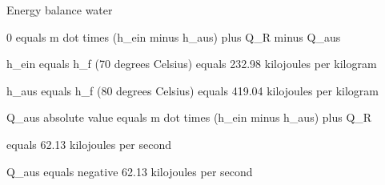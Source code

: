Energy balance water

0 equals m dot times (h_ein minus h_aus) plus Q_R minus Q_aus

h_ein equals h_f (70 degrees Celsius) equals 232.98 kilojoules per kilogram

h_aus equals h_f (80 degrees Celsius) equals 419.04 kilojoules per kilogram

Q_aus absolute value equals m dot times (h_ein minus h_aus) plus Q_R

equals 62.13 kilojoules per second

Q_aus equals negative 62.13 kilojoules per second